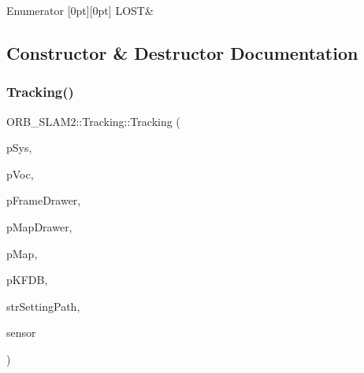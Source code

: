 \begin{DoxyEnumFields}{Enumerator}
[0pt][0pt]{}\mbox{\label{class_o_r_b___s_l_a_m2_1_1_tracking_a3995b5e23b910c6ee30b7fe21732fe36affaf8b66b0b767f1eb2b0214b3f37fb2}} 
L\+O\+ST&\\
\hline

\end{DoxyEnumFields}


\subsection{Constructor \& Destructor Documentation}
\mbox{\label{class_o_r_b___s_l_a_m2_1_1_tracking_a2e5ff2f26f1518166a028911b830c5b1}} 
\subsubsection{\texorpdfstring{Tracking()}{Tracking()}}
{\footnotesize\ttfamily O\+R\+B\+\_\+\+S\+L\+A\+M2\+::\+Tracking\+::\+Tracking (\begin{DoxyParamCaption}\item[{\mbox{\hyperlink{class_o_r_b___s_l_a_m2_1_1_system}{System}} $\ast$}]{p\+Sys,  }\item[{\mbox{\hyperlink{namespace_o_r_b___s_l_a_m2_a2fafba714858cab1bb18d438e2e83c5d}{O\+R\+B\+Vocabulary}} $\ast$}]{p\+Voc,  }\item[{\mbox{\hyperlink{class_o_r_b___s_l_a_m2_1_1_frame_drawer}{Frame\+Drawer}} $\ast$}]{p\+Frame\+Drawer,  }\item[{\mbox{\hyperlink{class_o_r_b___s_l_a_m2_1_1_map_drawer}{Map\+Drawer}} $\ast$}]{p\+Map\+Drawer,  }\item[{\mbox{\hyperlink{class_o_r_b___s_l_a_m2_1_1_map}{Map}} $\ast$}]{p\+Map,  }\item[{\mbox{\hyperlink{class_o_r_b___s_l_a_m2_1_1_key_frame_database}{Key\+Frame\+Database}} $\ast$}]{p\+K\+F\+DB,  }\item[{const string \&}]{str\+Setting\+Path,  }\item[{const int}]{sensor }\end{DoxyParamCaption})}



